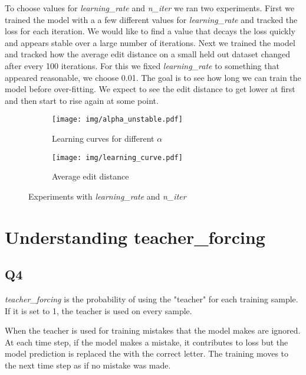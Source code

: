 \documentclass[12pt]{article}
\begin{document}
To choose values for \textit{learning\_rate} and \textit{n\_iter} we ran two experiments. 
First we trained the model with a a few different values for \textit{learning\_rate} and tracked the loss for each iteration. We would like to find a value that decays the loss quickly and appears stable over a large number of iterations.
Next we trained the model and tracked how the average edit distance on a small held out dataset changed after every 100 iterations. For this we fixed \textit{learning\_rate} to something that appeared reasonable, we choose 0.01. The goal is to see how long we can train the model before over-fitting. We expect to see the edit distance to get lower at first and then start to rise again at some point.

\begin{figure}[t!]
    \begin{subfigure}[t]{0.5\textwidth}
        \centering
        \texttt{[image: img/alpha\_unstable.pdf]}
        \caption{Learning curves for different $\alpha$}
        \label{fig_learning_rate}
    \end{subfigure}
    \begin{subfigure}[t]{0.5\textwidth}
        \centering
        \texttt{[image: img/learning\_curve.pdf]}
        \caption{Average edit distance}
        \label{fig_n_iter}
    \end{subfigure}
	\caption{Experiments with \textit{learning\_rate} and \textit{n\_iter}}
	\label{fig_train_param}
\end{figure}


\section{Understanding teacher\_forcing}

\subsection{Q4}

\textit{teacher\_forcing} is the probability of using the "teacher" for each training sample. If it is set to 1, the teacher is used on every sample.

When the teacher is used for training mistakes that the model makes are ignored. At each time step, if the model makes a mistake, it contributes to loss but the model prediction is replaced the with the correct letter. The training moves to the next time step as if no mistake was made.
\end{document}
